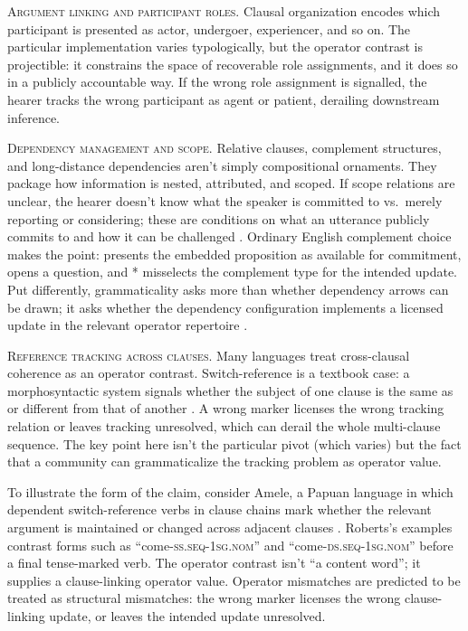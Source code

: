 \documentclass[12pt,letterpaper]{article}
\begin{document}
\textsc{Argument linking and participant roles.} Clausal organization encodes which participant is presented as actor, undergoer, experiencer, and so on. The particular implementation varies typologically, but the operator contrast is projectible: it constrains the space of recoverable role assignments, and it does so in a publicly accountable way. If the wrong role assignment is signalled, the hearer tracks the wrong participant as agent or patient, derailing downstream inference.

\textsc{Dependency management and scope.} Relative clauses, complement structures, and long-distance dependencies aren't simply compositional ornaments. They package how information is nested, attributed, and scoped. If scope relations are unclear, the hearer doesn't know what the speaker is committed to vs.\ merely reporting or considering; these are conditions on what an utterance publicly commits to and how it can be challenged \citep{stalnaker2002,farkasbruce2010}. Ordinary English complement choice makes the point:  presents the embedded proposition as available for commitment,  opens a question, and * misselects the complement type for the intended update. Put differently, grammaticality asks more than whether dependency arrows can be drawn; it asks whether the dependency configuration implements a licensed update in the relevant operator repertoire \citep{gibson2026}.

\textsc{Reference tracking across clauses.} Many languages treat cross-clausal coherence as an operator contrast. Switch-reference is a textbook case: a morphosyntactic system signals whether the subject of one clause is the same as or different from that of another \citep{vangijn2016}. A wrong marker licenses the wrong tracking relation or leaves tracking unresolved, which can derail the whole multi-clause sequence. The key point here isn't the particular pivot (which varies) but the fact that a community can grammaticalize the tracking problem as operator value.

To illustrate the form of the claim, consider Amele, a Papuan language in which dependent switch-reference verbs in clause chains mark whether the relevant argument is maintained or changed across adjacent clauses \citep{roberts1987,roberts1988,roberts2023amele}. Roberts's examples contrast forms such as  \enquote{come-\textsc{ss.seq}-1\textsc{sg.nom}} and  \enquote{come-\textsc{ds.seq}-1\textsc{sg.nom}} before a final tense-marked verb. The operator contrast isn't \enquote{a content word}; it supplies a clause-linking operator value. Operator mismatches are predicted to be treated as structural mismatches: the wrong marker licenses the wrong clause-linking update, or leaves the intended update unresolved.
\end{document}
